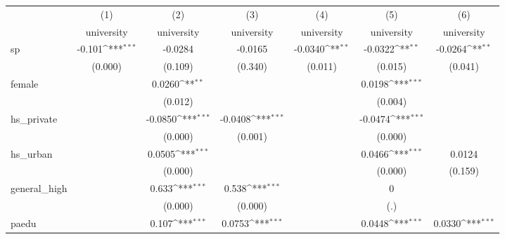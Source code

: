 {
\def\sym#1{\ifmmode^{#1}\else\(^{#1}\)\fi}
\begin{tabular}{l*{6}{c}}
\hline\hline
            &\multicolumn{1}{c}{(1)}&\multicolumn{1}{c}{(2)}&\multicolumn{1}{c}{(3)}&\multicolumn{1}{c}{(4)}&\multicolumn{1}{c}{(5)}&\multicolumn{1}{c}{(6)}\\
            &\multicolumn{1}{c}{university}&\multicolumn{1}{c}{university}&\multicolumn{1}{c}{university}&\multicolumn{1}{c}{university}&\multicolumn{1}{c}{university}&\multicolumn{1}{c}{university}\\
\hline
sp          &      -0.101\sym{***}&     -0.0284         &     -0.0165         &     -0.0340\sym{**} &     -0.0322\sym{**} &     -0.0264\sym{**} \\
            &     (0.000)         &     (0.109)         &     (0.340)         &     (0.011)         &     (0.015)         &     (0.041)         \\
[1em]
female      &                     &      0.0260\sym{**} &                     &                     &      0.0198\sym{***}&                     \\
            &                     &     (0.012)         &                     &                     &     (0.004)         &                     \\
[1em]
hs\_private  &                     &     -0.0850\sym{***}&     -0.0408\sym{***}&                     &     -0.0474\sym{***}&                     \\
            &                     &     (0.000)         &     (0.001)         &                     &     (0.000)         &                     \\
[1em]
hs\_urban    &                     &      0.0505\sym{***}&                     &                     &      0.0466\sym{***}&      0.0124         \\
            &                     &     (0.000)         &                     &                     &     (0.000)         &     (0.159)         \\
[1em]
general\_high&                     &       0.633\sym{***}&       0.538\sym{***}&                     &           0         &                     \\
            &                     &     (0.000)         &     (0.000)         &                     &         (.)         &                     \\
[1em]
paedu       &                     &       0.107\sym{***}&      0.0753\sym{***}&                     &      0.0448\sym{***}&      0.0330\sym{***}\\

\end{tabular}}
